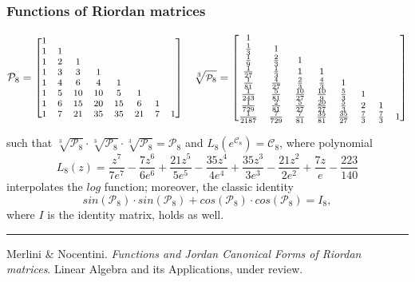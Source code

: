 \documentclass[9pt]{beamer}
\begin{document}
\begin{frame}[fragile]
\frametitle{Functions of Riordan matrices}
\begin{displaymath}
\footnotesize
    \mathcal{P}_{8}=\left[\begin{matrix}1 &   &   &   &   &   &   &  \\1 & 1 &   &   &   &   &   &  \\1 & 2 & 1 &   &   &   &   &  \\1 & 3 & 3 & 1 &   &   &   &  \\1 & 4 & 6 & 4 & 1 &   &   &  \\1 & 5 & 10 & 10 & 5 & 1 &   &  \\1 & 6 & 15 & 20 & 15 & 6 & 1 &  \\1 & 7 & 21 & 35 & 35 & 21 & 7 & 1\end{matrix}\right]
    \quad
    \sqrt[3]{\mathcal{P}_{8}}= \left[\begin{matrix}1 &  &  &  &  &  &  & \\\frac{1}{3} & 1 &  &  &  &  &  & \\\frac{1}{9} & \frac{2}{3} & 1 &  &  &  &  & \\\frac{1}{27} & \frac{1}{3} & 1 & 1 &  &  &  & \\\frac{1}{81} & \frac{4}{27} & \frac{2}{3} & \frac{4}{3} & 1 &  &  & \\\frac{1}{243} & \frac{5}{81} & \frac{10}{27} & \frac{10}{9} & \frac{5}{3} & 1 &  & \\\frac{1}{729} & \frac{2}{81} & \frac{5}{27} & \frac{20}{27} & \frac{5}{3} & 2 & 1 & \\\frac{1}{2187} & \frac{7}{729} & \frac{7}{81} & \frac{35}{81} & \frac{35}{27} & \frac{7}{3} & \frac{7}{3} & 1\end{matrix}\right]
\end{displaymath}

such that %
$\sqrt[3]{\mathcal{P}_8} \cdot \sqrt[3]{\mathcal{P}_8} \cdot
\sqrt[3]{\mathcal{P}_8} =\mathcal{P}_8$ and
$L_{8}\left({e^{\mathcal{C}_{8}}}\right) = \mathcal{C}_{8}$, where polynomial
\begin{displaymath}
{L_{ 8 }}{\left (z \right )} = \frac{z^{7}}{7 e^{7}} - \frac{7 z^{6}}{6 e^{6}} + \frac{21 z^{5}}{5 e^{5}} - \frac{35 z^{4}}{4 e^{4}} + \frac{35 z^{3}}{3 e^{3}} - \frac{21 z^{2}}{2 e^{2}} + \frac{7 z}{e} - \frac{223}{140}
\end{displaymath}
interpolates the $log$ function; moreover, the classic identity
$$sin(\mathcal{P}_8)\cdot sin(\mathcal{P}_8)+
cos(\mathcal{P}_8)\cdot cos(\mathcal{P}_8)=I_{8},$$
where $I$ is the identity matrix, holds as well.
\vfill
\noindent\rule{\textwidth}{0.1pt}
{\footnotesize
Merlini \& Nocentini. \textit{Functions and Jordan Canonical Forms of Riordan
matrices}. \newline Linear Algebra and its Applications, under review.}
\end{frame}
\end{document}
